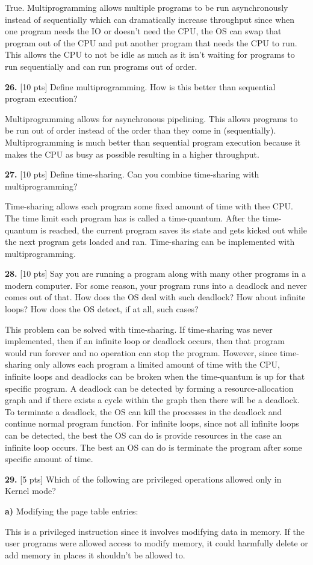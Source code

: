 \documentclass[12pt]{article}
\begin{document}
True. Multiprogramming allows multiple programs to be run asynchronously instead of sequentially which can dramatically increase throughput since when one program needs the IO or doesn't need the CPU, the OS can swap that program out of the CPU and put another program that needs the CPU to run. This allows the CPU to not be idle as much as it isn't waiting for programs to run sequentially and can run programs out of order. 

{\bf 26.} [10 pts] Define multiprogramming. How is this better than sequential program execution?

Multiprogramming allows for asynchronous pipelining. This allows programs to be run out of order instead of the order than they come in (sequentially). Multiprogramming is much better than sequential program execution because it makes the CPU as busy as possible resulting in a higher throughput. 

{\bf 27.} [10 pts] Define time-sharing. Can you combine time-sharing with multiprogramming?

Time-sharing allows each program some fixed amount of time with thee CPU. The time limit each program has is called a time-quantum. After the time-quantum is reached, the current program saves its state and gets kicked out while the next program gets loaded and ran. Time-sharing can be implemented with multiprogramming. 

{\bf 28.} [10 pts] Say you are running a program along with many other programs in a modern computer. For some reason, your program runs into a deadlock and never comes out of that. How does the OS deal with such deadlock? How about infinite loops? How does the OS detect, if at all, such cases?

This problem can be solved with time-sharing. If time-sharing was never implemented, then if an infinite loop or deadlock occurs, then that program would run forever and no operation can stop the program. However, since time-sharing only allows each program a limited amount of time with the CPU, infinite loops and deadlocks can be broken when the time-quantum is up for that specific program. A deadlock can be detected by forming a resource-allocation graph and if there exists a cycle within the graph then there will be a deadlock. To terminate a deadlock, the OS can kill the processes in the deadlock and continue normal program function. For infinite loops, since not all infinite loops can be detected, the best the OS can do is provide resources in the case an infinite loop occurs. The best an OS can do is terminate the program after some specific amount of time. 

{\bf 29.} [5 pts] Which of the following are privileged operations allowed only in Kernel mode?

{\bf a)}	Modifying the page table entries:	

This is a privileged instruction since it involves modifying data in memory. If the user programs were allowed access to modify memory, it could harmfully delete or add memory in places it shouldn't be allowed to. 
\end{document}
